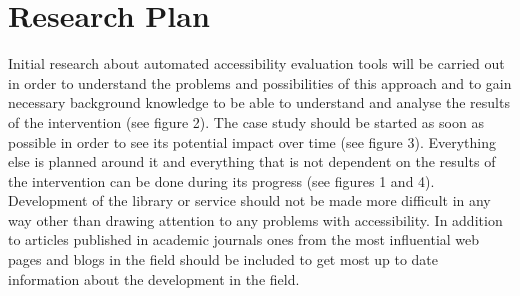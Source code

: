 \documentclass{thesis_proposal}
\begin{document}
\section{Research Plan}
Initial research about automated accessibility evaluation tools will be carried out in order to understand the problems and possibilities of this approach and to gain necessary background knowledge to be able to understand and analyse the results of the intervention (see figure 2). 
The case study should be started as soon as possible in order to see its potential impact over time (see figure 3). Everything else is planned around it and everything that is not dependent on the results of the intervention can be done during its progress (see figures 1 and 4). Development of the library or service should not be made more difficult in any way other than drawing attention to any problems with accessibility. 
In addition to articles published in academic journals ones from the most influential web pages and blogs in the field should be included to get most up to date information about the development in the field. 
\end{document}
